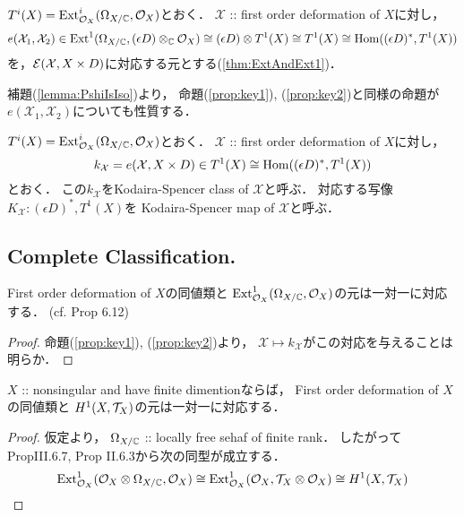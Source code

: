 \documentclass[a4paper]{jsarticle}
\newcommand{\famX}{\mathcal{X}}
\begin{document}
    \subsection{\tp{$e(\famX_1, \famX_2)$}{e(X1,X2)}}
    \begin{Def}
        $T^i(X)=\operatorname{Ext}^i_{\mathcal{O}_X}(\Omega_{X/\mathbb{C}}, \mathcal{O}_X)$とおく．
        $\famX$ :: first order deformation of $X$に対し，
        \[
            e(\famX_1, \famX_2)
                \in
                \Ext^1(\shDer_{X/\C}, (\epsilon D) \otimes_{\C} \shO_X)
                \iso (\epsilon D) \otimes T^1(X)
                \iso T^1(X)
                \iso \Hom((\epsilon D)^*, T^1(X))
        \]
        を，$\shE(\famX, X \times D)$に対応する元とする(\ref{thm:ExtAndExt1})．
    \end{Def}
    補題(\ref{lemma:PshiIsIso})より，
    命題(\ref{prop:key1}), (\ref{prop:key2})と同様の命題が
    $e(\famX_1, \famX_2)$についても性質する．

    \begin{Def}\label{def:KSclass-map}
        $T^i(X)=\operatorname{Ext}^i_{\mathcal{O}_X}(\Omega_{X/\mathbb{C}}, \mathcal{O}_X)$とおく．
        $\famX$ :: first order deformation of $X$に対し，
        \[
            k_{\famX}=e(\famX, X \times D)
                \in T^1(X) \iso \Hom((\epsilon D)^*, T^1(X))
        \]
        とおく．
        この$k_{\famX}$をKodaira-Spencer class of $\famX$と呼ぶ．
        対応する写像$K_{\famX}: (\epsilon D)^*, T^1(X)$を
        Kodaira-Spencer map of $\famX$と呼ぶ．
    \end{Def}
    
\subsection{Complete Classification.}
    \begin{Thm}\label{thm:SpaceOf1stOrdDefOfLCI}
        First order deformation of $X$の同値類と
        $\operatorname{Ext}^1_{\mathcal{O}_X}(\Omega_{X/\mathbb{C}}, \mathcal{O}_X)$の元は一対一に対応する．
        (cf. \cite{DefLCI} Prop 6.12)
    \end{Thm}
    \begin{proof}
        命題(\ref{prop:key1}), (\ref{prop:key2})より，
        $\famX \mapsto k_{\famX}$がこの対応を与えることは明らか．
    \end{proof}

    \begin{Cor} \label{cor:nonsing-fod}
        $X$ :: nonsingular and have finite dimentionならば，
        First order deformation of $X$の同値類と
        $H^1(X, \mathcal{T}_X)$の元は一対一に対応する．
    \end{Cor}
    \begin{proof}
        仮定より，
        $\Omega_{X/\mathbb{C}}$ :: locally free sehaf of finite rank．
        したがって\cite{HarAG} PropIII.6.7, Prop II.6.3から次の同型が成立する．
        \[
            \operatorname{Ext}^1_{\mathcal{O}_X}(\mathcal{O}_X \otimes \Omega_{X/\mathbb{C}}, \mathcal{O}_X)
            \cong \operatorname{Ext}^1_{\mathcal{O}_X}(\mathcal{O}_X, \mathcal{T}_X \otimes \mathcal{O}_X)
            \cong H^1(X, \mathcal{T}_X)
        \]
    \end{proof}
\end{document}
